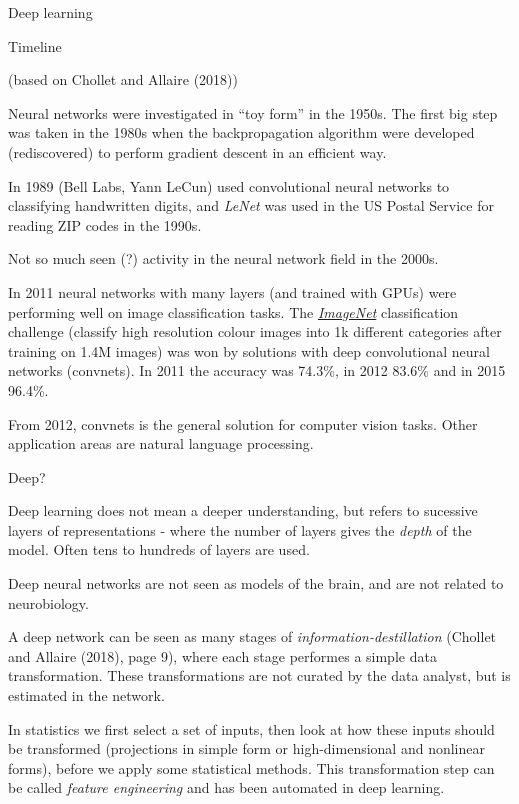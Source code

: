 \documentclass[10pt,ignorenonframetext,]{beamer}
\begin{document}
\begin{frame}{Deep learning}

\begin{block}{Timeline}

(based on Chollet and Allaire (2018))

Neural networks were investigated in ``toy form'' in the 1950s. The
first big step was taken in the 1980s when the backpropagation algorithm
were developed (rediscovered) to perform gradient descent in an
efficient way.

In 1989 (Bell Labs, Yann LeCun) used convolutional neural networks to
classifying handwritten digits, and \emph{LeNet} was used in the US
Postal Service for reading ZIP codes in the 1990s.

Not so much seen (?) activity in the neural network field in the 2000s.

\end{block}

\end{frame}

\begin{frame}

In 2011 neural networks with many layers (and trained with GPUs) were
performing well on image classification tasks. The
\href{http://www.image-net.org/}{\emph{ImageNet}} classification
challenge (classify high resolution colour images into 1k different
categories after training on 1.4M images) was won by solutions with deep
convolutional neural networks (convnets). In 2011 the accuracy was
74.3\%, in 2012 83.6\% and in 2015 96.4\%.

From 2012, convnets is the general solution for computer vision tasks.
Other application areas are natural language processing.

\end{frame}

\begin{frame}

\begin{block}{Deep?}

Deep learning does not mean a deeper understanding, but refers to
sucessive layers of representations - where the number of layers gives
the \emph{depth} of the model. Often tens to hundreds of layers are
used.

Deep neural networks are not seen as models of the brain, and are not
related to neurobiology.

A deep network can be seen as many stages of
\emph{information-destillation} (Chollet and Allaire (2018), page 9),
where each stage performes a simple data transformation. These
transformations are not curated by the data analyst, but is estimated in
the network.

In statistics we first select a set of inputs, then look at how these
inputs should be transformed (projections in simple form or
high-dimensional and nonlinear forms), before we apply some statistical
methods. This transformation step can be called \emph{feature
engineering} and has been automated in deep learning.

\end{block}

\end{frame}
\end{document}

